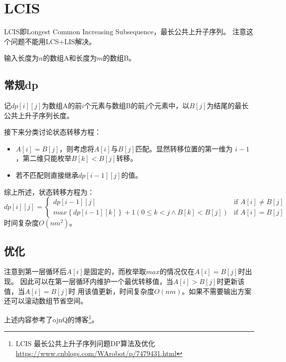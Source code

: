 \section{LCIS}
LCIS即Longest Common Increasing Subsequence，最长公共上升子序列。
注意这个问题不能用LCS+LIS解决。

输入长度为$n$的数组A和长度为$m$的数组B。
\subsection{常规dp}
记$dp[i][j]$为数组A的前$i$个元素与数组B的前$j$个元素中，以$B[j]$为结尾的最长
公共上升子序列长度。

接下来分类讨论状态转移方程：
\begin{itemize}
    \item $A[i]=B[j]$，则考虑将$A[i]$与$B[j]$匹配。显然转移位置的第一维为
    $i-1$，第二维只能枚举$B[k]<B[j]$转移。
    \item 若不匹配则直接继承$dp[i-1][j]$的值。
\end{itemize}

综上所述，状态转移方程为：
\begin{displaymath}
    dp[i][j]=\left\{\begin{array}{lr}
        dp[i-1][j]&\textrm{if~}A[i]\neq B[j]\\
        max\left\{dp[i-1][k]\right\}+1 (0\leq k <j \wedge B[k]<B[j])&
        \textrm{if~}A[i]=B[j]
    \end{array}\right.
\end{displaymath}
时间复杂度$O(nm^2)$。
\subsection{优化}
注意到第一层循环后$A[i]$是固定的，而枚举取$max$的情况仅在$A[i]=B[j]$时出现。
因此可以在第一层循环内维护一个最优转移值，当$A[i]>B[j]$时更新该值，当$A[i]=B[j]$时
用该值更新，时间复杂度$O(nm)$。如果不需要输出方案还可以滚动数组节省空间。

上述内容参考了ojnQ的博客\footnote{
    LCIS 最长公共上升子序列问题DP算法及优化
    \url{https://www.cnblogs.com/WArobot/p/7479431.html}
}。
